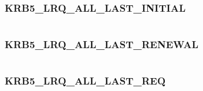 \documentclass[letterpaper,10pt,english]{sphinxmanual}
\begin{document}
\subsubsection{KRB5\_LRQ\_ALL\_LAST\_INITIAL}
\label{appdev/refs/macros/KRB5_LRQ_ALL_LAST_INITIAL::doc}\label{appdev/refs/macros/KRB5_LRQ_ALL_LAST_INITIAL:krb5-lrq-all-last-initial}\label{appdev/refs/macros/KRB5_LRQ_ALL_LAST_INITIAL:krb5-lrq-all-last-initial-data}

\begin{fulllineitems}
\label{appdev/refs/macros/KRB5_LRQ_ALL_LAST_INITIAL:KRB5_LRQ_ALL_LAST_INITIAL}
\end{fulllineitems}


\begin{tabulary}{\linewidth}{|L|L|}
\hline

 & 
\\\hline
\end{tabulary}



\subsubsection{KRB5\_LRQ\_ALL\_LAST\_RENEWAL}
\label{appdev/refs/macros/KRB5_LRQ_ALL_LAST_RENEWAL:krb5-lrq-all-last-renewal}\label{appdev/refs/macros/KRB5_LRQ_ALL_LAST_RENEWAL:krb5-lrq-all-last-renewal-data}\label{appdev/refs/macros/KRB5_LRQ_ALL_LAST_RENEWAL::doc}

\begin{fulllineitems}
\label{appdev/refs/macros/KRB5_LRQ_ALL_LAST_RENEWAL:KRB5_LRQ_ALL_LAST_RENEWAL}
\end{fulllineitems}


\begin{tabulary}{\linewidth}{|L|L|}
\hline

 & 
\\\hline
\end{tabulary}



\subsubsection{KRB5\_LRQ\_ALL\_LAST\_REQ}
\label{appdev/refs/macros/KRB5_LRQ_ALL_LAST_REQ::doc}\label{appdev/refs/macros/KRB5_LRQ_ALL_LAST_REQ:krb5-lrq-all-last-req}\label{appdev/refs/macros/KRB5_LRQ_ALL_LAST_REQ:krb5-lrq-all-last-req-data}
\end{document}
